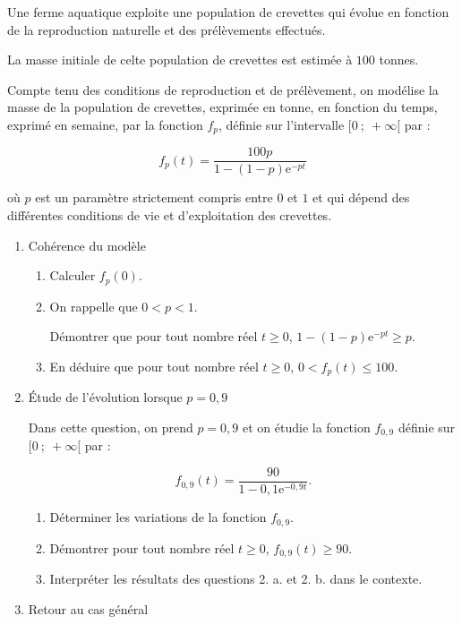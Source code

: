 \documentclass{cornouaille}
\begin{document}
\begin{exercice}
Une ferme aquatique exploite une population de crevettes qui évolue en fonction de la reproduction naturelle et des prélèvements effectués.

La masse initiale de celte population de crevettes est estimée à $100$ tonnes.

Compte tenu des conditions de reproduction et de prélèvement, on modélise la masse de la
population de crevettes, exprimée en tonne, en fonction du temps, exprimé en semaine, par la fonction $f_p$, définie sur l'intervalle $[0~;~ +\infty[$ par :

\[f_p(t) = \dfrac{100p}{1 - (1 - p)\text{e}^{- pt}}\]

où $p$ est un paramètre strictement compris entre $0$ et $1$ et qui dépend des différentes conditions de vie et d'exploitation des crevettes.

\medskip

\begin{enumerate}
\item Cohérence du modèle
	\begin{enumerate}
		\item Calculer $f_p(0)$.
		\item On rappelle que $0 < p < 1$.
		
Démontrer que pour tout nombre réel $t \geqslant 0$,\: $1 - (1 - p)\text{e}^{- pt} \geqslant p$.
		\item En déduire que pour tout nombre réel $t \geqslant 0$,\: $0 < f_p(t) \leqslant  100$.
 	\end{enumerate}
\item  Étude de l'évolution lorsque $p = 0,9$
	
Dans cette question, on prend $p = 0,9$ et on étudie la fonction $f_{0,9}$ définie sur $[0~;~+\infty[$ par :
	
\[f_{0,9}(t) = \dfrac{90}{1 - 0,1 \text{e}^{- 0,9t}}.\]
	
	\begin{enumerate}
		\item Déterminer les variations de la fonction $f_{0,9}$.
		\item Démontrer pour tout nombre réel $t \geqslant 0$,\: $f_{0,9}(t) \geqslant 90$.
		\item Interpréter les résultats des questions 2. a. et 2. b. dans le contexte.
	\end{enumerate}
\item  Retour au cas général
	

\end{enumerate}
\end{exercice}
\end{document}
